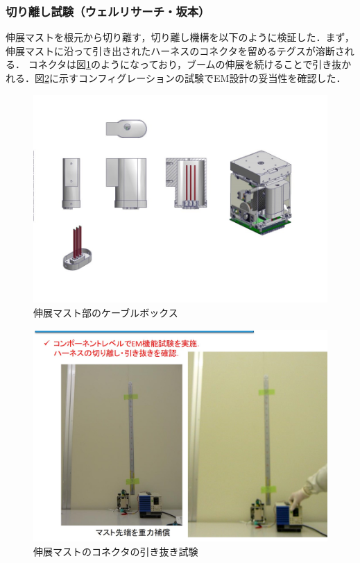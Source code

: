 \subsubsection{切り離し試験（ウェルリサーチ・坂本）}

伸展マストを根元から切り離す，切り離し機構を以下のように検証した．まず，伸展マストに沿って引き出されたハーネスのコネクタを留めるテグスが溶断される．
コネクタは図\ref{fig3-9-2-1-4}のようになっており，ブームの伸展を続けることで引き抜かれる．図\ref{fig3-9-2-1-5}に示すコンフィグレーションの試験でEM設計の妥当性を確認した．
\begin{figure}[H]
	\centering
	\includegraphics[width=.7\textwidth]{03/fig/3-9-2-1-4.jpg}
	\caption{伸展マスト部のケーブルボックス}
	\label{fig3-9-2-1-4}
\end{figure}
\begin{figure}[H]
	\centering
	\includegraphics[width=.8\textwidth]{03/fig/3-9-2-1-5.jpg}
	\caption{伸展マストのコネクタの引き抜き試験}
	\label{fig3-9-2-1-5}
\end{figure}

